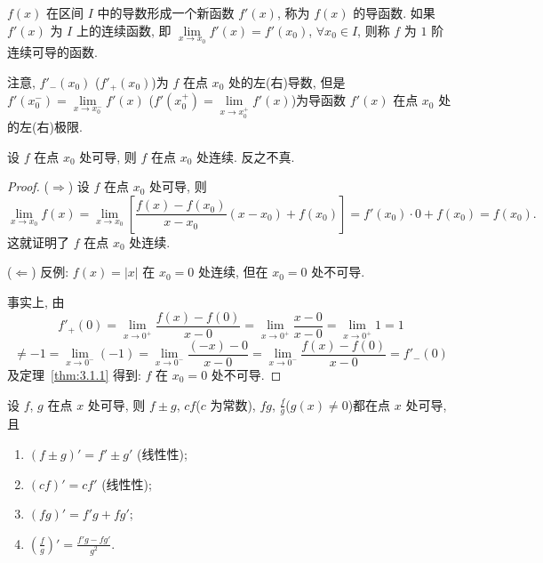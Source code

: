 $f(x)$ 在区间 $I$ 中的导数形成一个新函数 $f'(x)$, 称为 $f(x)$ 的导函数. 如果 $f'(x)$ 为 $I$ 上的连续函数, 即 $\lim\limits_{x\to x_0}f'(x) = f'(x_0)$, $\forall x_0 \in I$, 则称 $f$ 为 $1$ 阶连续可导的函数.

注意, $f'_-(x_0)$ ($f'_+(x_0)$)为 $f$ 在点 $x_0$ 处的左(右)导数, 但是 $f'(x_0^-) = \lim\limits_{x\to x_0^-}f'(x)$ ($f'(x_0^+) = \lim\limits_{x\to x_0^+}f'(x)$)为导函数 $f'(x)$ 在点 $x_0$ 处的左(右)极限.

\begin{theorem}\label{thm:3.1.2}
设 $f$ 在点 $x_0$ 处可导, 则 $f$ 在点 $x_0$ 处连续. 反之不真.
\end{theorem}

\begin{proof}
($\Rightarrow$) 设 $f$ 在点 $x_0$ 处可导, 则
\[
\lim_{x\to x_0}f(x) = \lim_{x\to x_0}\left[\frac{f(x) - f(x_0)}{x - x_0}(x - x_0) + f(x_0)\right] = f'(x_0)\cdot0 + f(x_0) = f(x_0).
\]
这就证明了 $f$ 在点 $x_0$ 处连续.

($\Leftarrow$) 反例: $f(x) = |x|$ 在 $x_0 = 0$ 处连续, 但在 $x_0 = 0$ 处不可导.

事实上, 由
\[
f'_+(0) = \lim_{x\to0^+}\frac{f(x) - f(0)}{x - 0} = \lim_{x\to0^+}\frac{x - 0}{x - 0} = \lim_{x\to0^+}1 = 1
\]
\[
\neq -1 = \lim_{x\to0^-}(-1) = \lim_{x\to0^-}\frac{(-x) - 0}{x - 0} = \lim_{x\to0^-}\frac{f(x) - f(0)}{x - 0} = f'_-(0)
\]
及定理~\ref{thm:3.1.1} 得到: $f$ 在 $x_0 = 0$ 处不可导.
\end{proof}

\begin{theorem}[求导的四则运算法则]\label{thm:3.1.3}
设 $f$, $g$ 在点 $x$ 处可导, 则 $f \pm g$, $cf$($c$ 为常数), $fg$, $\frac{f}{g}$($g(x) \neq 0$)都在点 $x$ 处可导, 且
\begin{enumerate}[label=(\arabic*)]
  \item $(f \pm g)' = f' \pm g'$ (线性性);
  \item $(cf)' = cf'$ (线性性);
  \item $(fg)' = f'g + fg'$;
  \item $\left(\frac{f}{g}\right)' = \frac{f'g - fg'}{g^2}$.
\end{enumerate}
\end{theorem}

